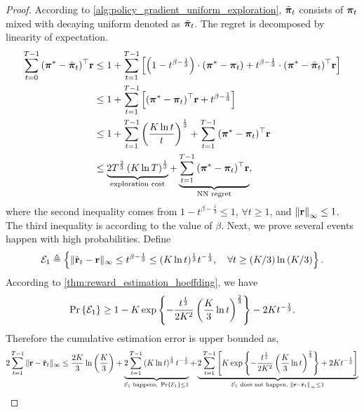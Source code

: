 \begin{proof}
    According to \cref{alg:policy_gradient_uniform_exploration}, $\tilde{{\boldsymbol{\pi}}}_t$ consists of ${\boldsymbol{\pi}}_t$ mixed with decaying uniform denoted as $\bar{{\boldsymbol{\pi}}}_t$. The regret is decomposed by linearity of expectation.
\begin{equation}
\label{eq:total_regret_decomposition_appendix}
\begin{split}
    \sum\limits_{t=0}^{T-1}{ ( {{\boldsymbol{\pi}}^*} - \tilde{{\boldsymbol{\pi}}}_t )^\top {\mathbf{r}} } &\le 1 + \sum\limits_{t=1}^{T-1}{ \left[ \left( 1 - t^{ \beta - \frac{1}{3}} \right) \cdot \left( {{\boldsymbol{\pi}}^*} - {\boldsymbol{\pi}}_t \right) + t^{ \beta - \frac{1}{3}} \cdot ( {{\boldsymbol{\pi}}^*} - \bar{{\boldsymbol{\pi}}}_t )^\top {\mathbf{r}} \right]} \\
    &\le 1 + \sum\limits_{t=1}^{T-1}{ \left[ ( {{\boldsymbol{\pi}}^*} - {\boldsymbol{\pi}}_t )^\top {\mathbf{r}} + t^{ \beta - \frac{1}{3}} \right]} \\
    &\le 1 + \sum\limits_{t=1}^{T-1}{ \left( \frac{ K \ln{t} }{t} \right)^{\frac{1}{3}} } + \sum\limits_{t=1}^{T-1}{ ( {{\boldsymbol{\pi}}^*} - {\boldsymbol{\pi}}_t )^\top {\mathbf{r}} } \\
    &\le \underbrace{ 2 T^{\frac{2}{3}} \left( K \ln{T} \right)^{\frac{1}{3}} }_{\text{exploration cost}}+ \underbrace{ \sum\limits_{t=1}^{T-1}{ ( {{\boldsymbol{\pi}}^*} - {\boldsymbol{\pi}}_t )^\top {\mathbf{r}} }}_{\text{NN regret}},
\end{split}
\end{equation}
where the second inequality comes from $1 - t^{ \beta - \frac{1}{3}} \le 1$, $\forall t \ge 1$, and $\left\| {\mathbf{r}} \right\|_\infty \le 1$. The third inequality is according to the value of $\beta$. Next, we prove several events happen with high probabilities. Define
\begin{equation*}
    {\mathcal{E}}_1 \triangleq \left\{ \| \hat{{\mathbf{r}}}_t - {\mathbf{r}} \|_\infty \le t^{\beta - \frac{1}{3}} \le ( K \ln{t} ) ^\frac{1}{3} t^{- \frac{1}{3}}, \quad \forall t \ge (K/3) \ln{\left(K/3\right) } \right\}.
\end{equation*}
According to \cref{thm:reward_estimation_hoeffding}, we have 
\begin{equation*}
    \operatorname*{Pr}\left\{ {\mathcal{E}}_1 \right\} \ge
    1 - K \exp\left\{ - \frac{t^{\frac{1}{3}}}{2 K^2} \left( \frac{K}{3} \ln{t} \right)^{\frac{2}{3}} \right\} - 2 K t^{- \frac{1}{3}}.
\end{equation*}
Therefore the cumulative estimation error is upper bounded as,
\begin{equation}
\label{eq:estimation_upper_bound_appendix}
\begin{split}
    2 \sum\limits_{t=1}^{T-1}{ \| \rvr - \hat{\rvr}_t \|_\infty } &\le \frac{2 K}{3} \ln{\left(\frac{K}{3}\right) } + \underbrace{2 \sum\limits_{t=1}^{T-1}{ \left( K \ln{t} \right) ^\frac{1}{3} t^{- \frac{1}{3}} }}_{\gE_1 \text{ happens, } \probability\left\{ \gE_1 \right\} \le 1} + \underbrace{ 2  \sum\limits_{t=1}^{T-1}{ \left[ K \exp\left\{ - \frac{t^{\frac{1}{3}}}{2 K^2} \left( \frac{K}{3} \ln{t} \right)^{\frac{2}{3}} \right\} + 2 K t^{- \frac{1}{3}} \right] } }_{ \gE_1 \text{ does not happen, } \left\| \rvr - \hat{\rvr}_t \right\|_\infty \le 1 } \\

\end{split}
\end{equation}
\end{proof}
